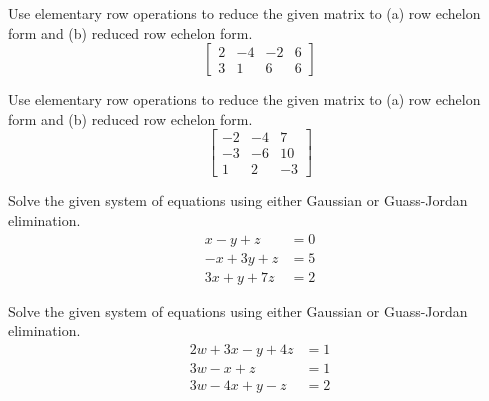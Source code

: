 \documentclass[12pt,letterpaper]{hmcpset}
\begin{document}

\begin{problem}[2.2.12]
Use elementary row operations to reduce the given matrix to (a) row echelon form and (b) reduced row echelon form. $$ \begin{bmatrix}
	2 & -4 & -2 & 6\\
	3 & 1 & 6 & 6
\end{bmatrix}$$

\end{problem}

\begin{solution}
\vfill
\end{solution}

\newpage

\begin{problem}[2.2.14]

Use elementary row operations to reduce the given matrix to (a) row echelon form and (b) reduced row echelon form. $$ \begin{bmatrix}
	-2 & -4 & 7\\
	-3 & -6 & 10\\
	1 & 2 & -3
\end{bmatrix}$$

\end{problem}

\begin{solution}
\vfill
\end{solution}
\newpage

\begin{problem}[2.2.26]
Solve the given system of equations using either Gaussian or Guass-Jordan elimination.
	\begin{align*}
		x - y + z &= 0\\
		-x + 3y + z &= 5\\
		3x + y + 7z &= 2
	\end{align*}
\end{problem}

\begin{solution}
\vfill
\end{solution}
\newpage

\begin{problem}[2.2.28]

Solve the given system of equations using either Gaussian or Guass-Jordan elimination.
	\begin{align*}
		2w + 3x - y + 4z &= 1\\
		3w - x + z &= 1\\
		3w - 4x + y - z &= 2
	\end{align*}

\end{problem}
\end{document}

